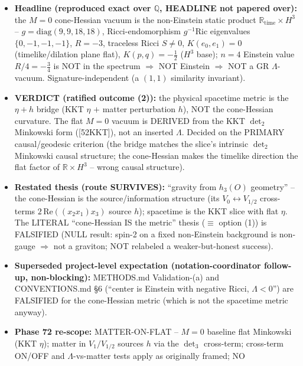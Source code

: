 \begin{itemize}
  \item \textbf{Headline (reproduced exact over $\mathbb{Q}$, HEADLINE not papered over):}
        the $M=0$ cone-Hessian vacuum is the non-Einstein static product
        $\mathbb{R}_{\text{time}}\times H^3$ -- $g=\mathrm{diag}(9,9,18,18)$, Ricci-endomorphism
        $g^{-1}\mathrm{Ric}$ eigenvalues $\{0,-1,-1,-1\}$, $R=-3$, traceless Ricci $S\neq0$,
        $K(e_0,e_1)=0$ (timelike/dilation plane flat), $K(p,q)=-\tfrac12$ ($H^3$ base);
        $n=4$ Einstein value $R/4=-\tfrac34$ is NOT in the spectrum $\Rightarrow$ NOT
        Einstein $\Rightarrow$ NOT a GR $\Lambda$-vacuum. Signature-independent (a $(1,1)$
        similarity invariant).
  \item \textbf{VERDICT (ratified outcome (2)):} the physical spacetime metric is the
        $\eta+h$ bridge (KKT $\eta$ $+$ matter perturbation $h$), NOT the cone-Hessian
        curvature. The flat $M=0$ vacuum is DERIVED from the KKT $\det_2$ Minkowski form
        ([52KKT]), not an inserted $\Lambda$. Decided on the PRIMARY causal/geodesic
        criterion (the bridge matches the slice's intrinsic $\det_2$ Minkowski causal
        structure; the cone-Hessian makes the timelike direction the flat factor of
        $\mathbb{R}\times H^3$ -- wrong causal structure).
  \item \textbf{Restated thesis (route SURVIVES):} ``gravity from $h_3(O)$ geometry'' --
        the cone-Hessian is the source/information structure (its $V_0\!\leftrightarrow\!V_{1/2}$
        cross-terms $2\,\mathrm{Re}((x_2 x_1)x_3)$ source $h$); spacetime is the KKT slice
        with flat $\eta$. The LITERAL ``cone-Hessian IS the metric'' thesis ($\equiv$ option
        (1)) is FALSIFIED (NULL result: spin-2 on a fixed non-Einstein background is
        non-gauge $\Rightarrow$ not a graviton; NOT relabeled a weaker-but-honest success).
  \item \textbf{Superseded project-level expectation (notation-coordinator follow-up,
        non-blocking):} METHODS.md Validation-(a) and CONVENTIONS.md \S6 (``center is
        Einstein with negative Ricci, $\Lambda<0$'') are FALSIFIED for the cone-Hessian
        metric (which is not the spacetime metric anyway).
  \item \textbf{Phase 72 re-scope:} MATTER-ON-FLAT -- $M=0$ baseline flat Minkowski (KKT
        $\eta$); matter in $V_1/V_{1/2}$ sources $h$ via the $\det_3$ cross-term;
        cross-term ON/OFF and $\Lambda$-vs-matter tests apply as originally framed; NO

\end{itemize}
